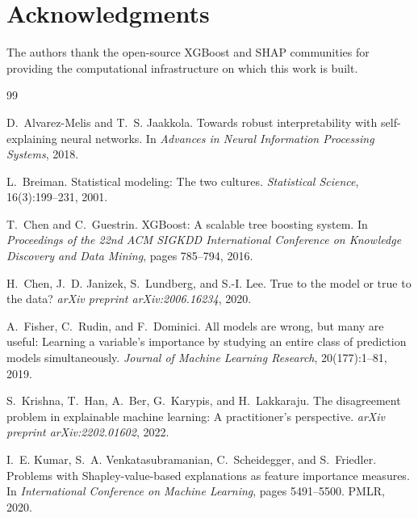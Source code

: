 \documentclass[11pt]{article}
\begin{document}
\section*{Acknowledgments}

The authors thank the open-source XGBoost and SHAP communities for
providing the computational infrastructure on which this work is built.



% 

\begin{thebibliography}{99}

D.~Alvarez-Melis and T.~S. Jaakkola.
\newblock Towards robust interpretability with self-explaining neural networks.
\newblock In \emph{Advances in Neural Information Processing Systems}, 2018.

L.~Breiman.
\newblock Statistical modeling: The two cultures.
\newblock \emph{Statistical Science}, 16(3):199--231, 2001.

T.~Chen and C.~Guestrin.
\newblock XGBoost: A scalable tree boosting system.
\newblock In \emph{Proceedings of the 22nd ACM SIGKDD International Conference
  on Knowledge Discovery and Data Mining}, pages 785--794, 2016.

H.~Chen, J.~D. Janizek, S.~Lundberg, and S.-I. Lee.
\newblock True to the model or true to the data?
\newblock \emph{arXiv preprint arXiv:2006.16234}, 2020.

A.~Fisher, C.~Rudin, and F.~Dominici.
\newblock All models are wrong, but many are useful: Learning a variable's
  importance by studying an entire class of prediction models simultaneously.
\newblock \emph{Journal of Machine Learning Research}, 20(177):1--81, 2019.

S.~Krishna, T.~Han, A.~Ber, G.~Karypis, and H.~Lakkaraju.
\newblock The disagreement problem in explainable machine learning: A
  practitioner's perspective.
\newblock \emph{arXiv preprint arXiv:2202.01602}, 2022.

I.~E. Kumar, S.~A. Venkatasubramanian, C.~Scheidegger, and S.~Friedler.
\newblock Problems with {S}hapley-value-based explanations as feature importance
  measures.
\newblock In \emph{International Conference on Machine Learning}, pages
  5491--5500. PMLR, 2020.


\end{thebibliography}
\end{document}
